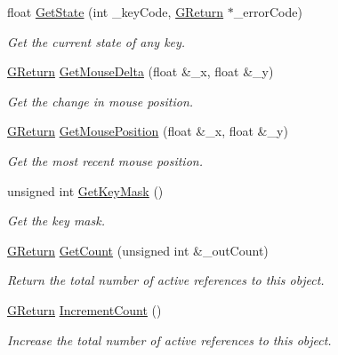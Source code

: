 \begin{DoxyCompactItemize}
\item 
float \hyperlink{classInput_a7e468df0f31131f3fbcbc6de87d01ec2}{Get\+State} (int \+\_\+key\+Code, \hyperlink{namespaceGW_a67a839e3df7ea8a5c5686613a7a3de21}{G\+Return} $\ast$\+\_\+error\+Code)
\begin{DoxyCompactList}\small\item\em Get the current state of any key. \end{DoxyCompactList}\item 
\hyperlink{namespaceGW_a67a839e3df7ea8a5c5686613a7a3de21}{G\+Return} \hyperlink{classInput_a82d54ae7aa3ecacebe42480eb0aff985}{Get\+Mouse\+Delta} (float \&\+\_\+x, float \&\+\_\+y)
\begin{DoxyCompactList}\small\item\em Get the change in mouse position. \end{DoxyCompactList}\item 
\hyperlink{namespaceGW_a67a839e3df7ea8a5c5686613a7a3de21}{G\+Return} \hyperlink{classInput_a93d7ab591a1d1e8d619318834c75207a}{Get\+Mouse\+Position} (float \&\+\_\+x, float \&\+\_\+y)
\begin{DoxyCompactList}\small\item\em Get the most recent mouse position. \end{DoxyCompactList}\item 
unsigned int \hyperlink{classInput_a8f9b65ea323da8c25a5e70eb6746d4ab}{Get\+Key\+Mask} ()
\begin{DoxyCompactList}\small\item\em Get the key mask. \end{DoxyCompactList}\item 
\hyperlink{namespaceGW_a67a839e3df7ea8a5c5686613a7a3de21}{G\+Return} \hyperlink{classInput_a2fd6659ae76357836c4c9b3e7070ffb0}{Get\+Count} (unsigned int \&\+\_\+out\+Count)
\begin{DoxyCompactList}\small\item\em Return the total number of active references to this object. \end{DoxyCompactList}\item 
\hyperlink{namespaceGW_a67a839e3df7ea8a5c5686613a7a3de21}{G\+Return} \hyperlink{classInput_a3c2103023cbb1fa583f910539bb6cce3}{Increment\+Count} ()
\begin{DoxyCompactList}\small\item\em Increase the total number of active references to this object. \end{DoxyCompactList}\item 

\end{DoxyCompactItemize}
